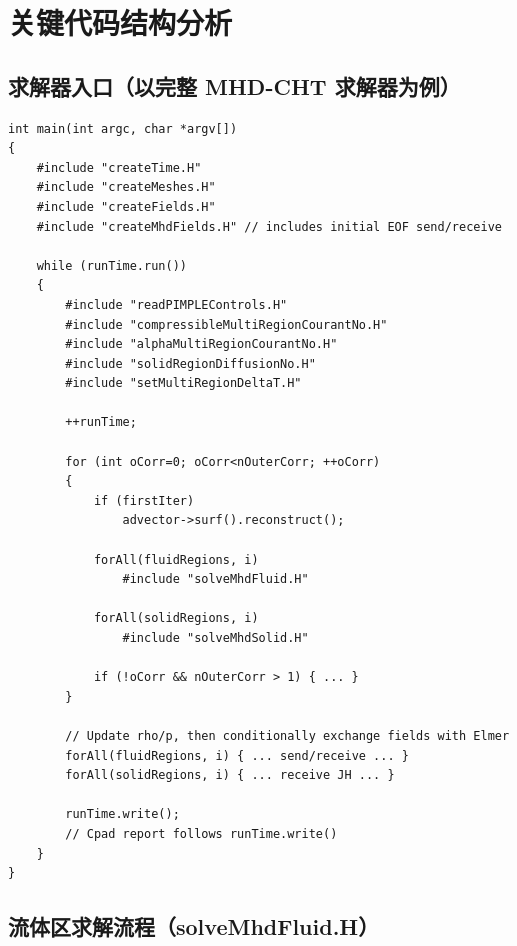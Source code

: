 \documentclass[11pt,a4paper]{article}
\begin{document}
\section{关键代码结构分析}

\subsection{求解器入口（以完整 MHD-CHT 求解器为例）}

\begin{lstlisting}[style=cppstyle, caption={mhdChtMultiRegionInterIsoFoamCpad\_mod.C 主程序结构}]
int main(int argc, char *argv[])
{
    #include "createTime.H"
    #include "createMeshes.H"
    #include "createFields.H"
    #include "createMhdFields.H" // includes initial EOF send/receive

    while (runTime.run())
    {
        #include "readPIMPLEControls.H"
        #include "compressibleMultiRegionCourantNo.H"
        #include "alphaMultiRegionCourantNo.H"
        #include "solidRegionDiffusionNo.H"
        #include "setMultiRegionDeltaT.H"

        ++runTime;

        for (int oCorr=0; oCorr<nOuterCorr; ++oCorr)
        {
            if (firstIter)
                advector->surf().reconstruct();

            forAll(fluidRegions, i)
                #include "solveMhdFluid.H"

            forAll(solidRegions, i)
                #include "solveMhdSolid.H"

            if (!oCorr && nOuterCorr > 1) { ... }
        }

        // Update rho/p, then conditionally exchange fields with Elmer
        forAll(fluidRegions, i) { ... send/receive ... }
        forAll(solidRegions, i) { ... receive JH ... }

        runTime.write();
        // Cpad report follows runTime.write()
    }
}
\end{lstlisting}

\subsection{流体区求解流程（solveMhdFluid.H）}
\end{document}
